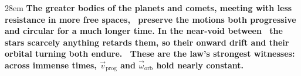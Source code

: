 \documentclass[border=4pt]{standalone}
\begin{document}
\begin{varwidth}{28em}
\large\bfseries
The greater bodies of the \textcolor{bodies}{planets and comets}, meeting with less resistance in \textcolor{free}{more free spaces}, \     preserve the \textcolor{motions}{motions both progressive and circular} for a much longer time. In the near-void between \     the stars scarcely anything retards them, so their onward drift and their orbital turning both endure. \     These are the law's strongest witnesses: across immense times, $\vec{v}_{\text{prog}}$ and $\vec{\omega}_{\text{orb}}$ hold nearly constant.
\end{varwidth}
\end{document}
